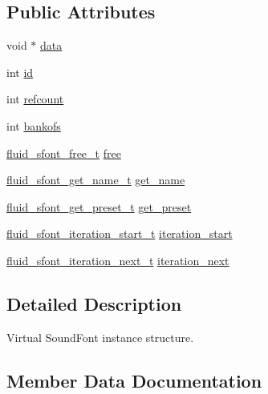 \subsection*{Public Attributes}
\begin{DoxyCompactItemize}
\item 
void $\ast$ \hyperlink{struct__fluid__sfont__t_a5a79644021fa078479da5273c4ebfbbc}{data}
\item 
int \hyperlink{struct__fluid__sfont__t_ae4d9ebeb04ab1e6af64f2b0f94da6174}{id}
\item 
int \hyperlink{struct__fluid__sfont__t_a71bae1b34460e3b0d6ed98fb072a73bd}{refcount}
\item 
int \hyperlink{struct__fluid__sfont__t_a7f62449a63ddea4c1e2b841f824eee61}{bankofs}
\item 
\hyperlink{sfont_8h_aad47ceab3ec2c3fed9437a796225a875}{fluid\+\_\+sfont\+\_\+free\+\_\+t} \hyperlink{struct__fluid__sfont__t_abcc049d7b150090b9be0265011e5f832}{free}
\item 
\hyperlink{sfont_8h_acd7242e3e80a5ae096c93dae7f30d7f4}{fluid\+\_\+sfont\+\_\+get\+\_\+name\+\_\+t} \hyperlink{struct__fluid__sfont__t_a929dd42064e5eaa61bfe3682eeae23aa}{get\+\_\+name}
\item 
\hyperlink{sfont_8h_afe6fe536f98021be6598525a9e517f2f}{fluid\+\_\+sfont\+\_\+get\+\_\+preset\+\_\+t} \hyperlink{struct__fluid__sfont__t_a2ac8d2d07d908d76fd84417c4bcd9b57}{get\+\_\+preset}
\item 
\hyperlink{fluid__sfont_8h_a80ffb76a9a2c640816f57889666c28cb}{fluid\+\_\+sfont\+\_\+iteration\+\_\+start\+\_\+t} \hyperlink{struct__fluid__sfont__t_ae085ae4aba987fe1725bbc6a1d0d9532}{iteration\+\_\+start}
\item 
\hyperlink{fluid__sfont_8h_aecaff75beb3685fad68dea387555a6e5}{fluid\+\_\+sfont\+\_\+iteration\+\_\+next\+\_\+t} \hyperlink{struct__fluid__sfont__t_a79ac963ce5c6b7e31a7cb41cdcb71f70}{iteration\+\_\+next}
\end{DoxyCompactItemize}


\subsection{Detailed Description}
Virtual Sound\+Font instance structure. 

\subsection{Member Data Documentation}
\mbox{\label{struct__fluid__sfont__t_a7f62449a63ddea4c1e2b841f824eee61}} 
